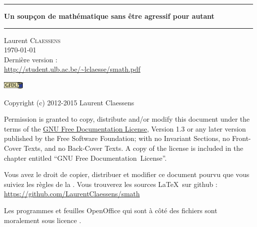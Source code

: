 
\thispagestyle{empty}

\begin{center}
  \begin{minipage}{15cm}
    \hrule\par
    \vspace{2mm}
    \begin{center}
    \Huge \bfseries Un soupçon de mathématique sans être agressif pour autant \par
    \end{center}
    \hrule\par
  \end{minipage}
\end{center}

\vspace{2cm}

\begin{center}
    Laurent \textsc{Claessens}\\
    \today\\
    Dernière version :\\
    \url{http://student.ulb.ac.be/~lclaesse/smath.pdf}
\end{center}

\vfill

\begin{center}
            \includegraphics[width=1cm]{gfdl-logo-small.pdf}
\end{center}

Copyright (c) 2012-2015  Laurent Claessens

Permission is granted to copy, distribute and/or modify this document under the terms of the \href{http://www.gnu.org/licenses/fdl-1.3.html}{GNU Free Documentation License}, Version 1.3 or any later version published by the Free Software Foundation; with no Invariant Sections, no Front-Cover Texts, and no Back-Cover Texts. A copy of the license is included in the chapter entitled ``GNU Free Documentation~License''.

\vspace{0.5cm}

Vous avez le droit de copier, distribuer et modifier ce document pourvu que vous suiviez les règles de la . Vous trouverez les sources \LaTeX\ sur github :\\
    \url{https://github.com/LaurentClaessens/smath}

    Les programmes et feuilles OpenOffice qui sont à côté des fichiers  sont moralement sous licence .
